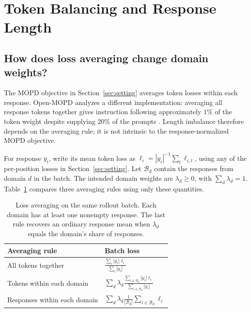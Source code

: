 \section{Token Balancing and Response Length}
\label{sec:normalization}

\subsection{How does loss averaging change domain weights?}

The MOPD objective in Section~\ref{sec:setting} averages token losses
within each response. Open-MOPD analyzes a different implementation:
averaging all response tokens together gives instruction following
approximately $1\%$ of the token weight despite supplying $20\%$ of
the prompts \citep{gao2026openmopddiagnosingfixingcapability}.
Length imbalance therefore depends on the averaging rule; it is not
intrinsic to the response-normalized MOPD objective.

For response $y_i$, write its mean token loss as
$\ell_i=|y_i|^{-1}\sum_t\ell_{i,t}$, using any of the per-position
losses in Section~\ref{sec:setting}. Let $\mathcal B_d$ contain the
responses from domain $d$ in the batch. The intended domain weights
are $\lambda_d\geq0$, with $\sum_d\lambda_d=1$.
Table~\ref{tab:normalization} compares three averaging rules using
only these quantities.

\begin{table}[!htbp]
\centering
\small
\renewcommand{\arraystretch}{1.65}
\begin{tabular}{@{}ll@{}}
\toprule
Averaging rule & Batch loss \\
\midrule
All tokens together
  & $\displaystyle\frac{\sum_i |y_i|\ell_i}{\sum_i |y_i|}$ \\
Tokens within each domain
  & $\displaystyle\sum_d\lambda_d
    \frac{\sum_{i\in\mathcal B_d}|y_i|\ell_i}
         {\sum_{i\in\mathcal B_d}|y_i|}$ \\
Responses within each domain
  & $\displaystyle\sum_d\lambda_d
    \frac{1}{|\mathcal B_d|}\sum_{i\in\mathcal B_d}\ell_i$ \\
\bottomrule
\end{tabular}
\caption{Loss averaging on the same rollout batch. Each domain has at least
one nonempty response. The last rule recovers an ordinary response mean
when $\lambda_d$ equals the domain's share of responses.}
\label{tab:normalization}
\end{table}

